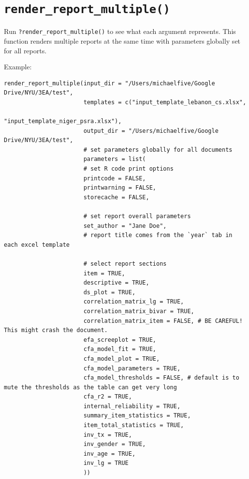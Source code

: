 \documentclass[
]{book}
\begin{document}
\hypertarget{render_report_multiple}{%
\section{\texorpdfstring{\texttt{render\_report\_multiple()}}{render\_report\_multiple()}}\label{render_report_multiple}}

Run \texttt{?render\_report\_multiple()} to see what each argument represents. This function renders multiple reports at the same time with parameters globally set for all reports.

Example:

\begin{verbatim}
render_report_multiple(input_dir = "/Users/michaelfive/Google Drive/NYU/3EA/test",
                       templates = c("input_template_lebanon_cs.xlsx",
                                     "input_template_niger_psra.xlsx"),
                       output_dir = "/Users/michaelfive/Google Drive/NYU/3EA/test",
                       # set parameters globally for all documents
                       parameters = list(
                       # set R code print options
                       printcode = FALSE,
                       printwarning = FALSE,
                       storecache = FALSE,

                       # set report overall parameters
                       set_author = "Jane Doe",
                       # report title comes from the `year` tab in each excel template

                       # select report sections
                       item = TRUE,
                       descriptive = TRUE,
                       ds_plot = TRUE,
                       correlation_matrix_lg = TRUE,
                       correlation_matrix_bivar = TRUE,
                       correlation_matrix_item = FALSE, # BE CAREFUL! This might crash the document.
                       efa_screeplot = TRUE,
                       cfa_model_fit = TRUE,
                       cfa_model_plot = TRUE,
                       cfa_model_parameters = TRUE,
                       cfa_model_thresholds = FALSE, # default is to mute the thresholds as the table can get very long
                       cfa_r2 = TRUE,
                       internal_reliability = TRUE,
                       summary_item_statistics = TRUE,
                       item_total_statistics = TRUE,
                       inv_tx = TRUE,
                       inv_gender = TRUE,
                       inv_age = TRUE,
                       inv_lg = TRUE
                       ))
\end{verbatim}
\end{document}
